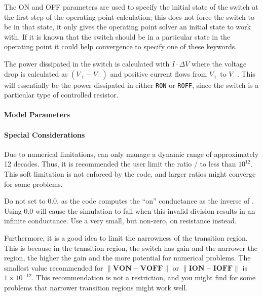 \begin{Device}
The ON and OFF parameters are used to specify the initial state of the
switch at the first step of the operating point calculation; this does
not force the switch to be in that state, it only gives the operating
point solver an initial state to work with.  If it is known that the
switch should be in a particular state in the operating point it could
help convergence to specify one of these keywords.

The power dissipated in the switch is calculated with $I \cdot \Delta V$ 
where the voltage drop is calculated as $(V_+ - V_-)$ and positive current 
flows from $V_+$ to $V_-$.  This will essentially be the power dissipated
in either \texttt{RON} or \texttt{ROFF}, since the switch is a particular 
type of controlled resistor.

\end{Device}

\pagebreak

\paragraph{Model Parameters}


\paragraph{Special Considerations}

\begin{XyceItemize}
\item Due to numerical limitations, \Xyce{} can only manage a dynamic range of
  approximately 12 decades.  Thus, it is recommended the user limit the ratio
  / to less than $10^{12}$.  This soft limitation is not enforced by the code, and larger ratios might converge for some problems.
\item Do not set  to 0.0, as the code computes the ``on'' conductance as the inverse of .  Using 0.0 will cause the simulation to fail when this invalid division results in an infinite conductance.  Use a very small, but non-zero, on resistance instead.
\item Furthermore, it is a good idea to limit the narrowness of the transition
  region. This is because in the transition region, the switch has gain and the
  narrower the region, the higher the gain and the more potential for numerical
  problems.  The smallest value recommended for $\|\mathbf{VON - VOFF}\|$ or
  $\|\mathbf{ION - IOFF}\|$ is $1\times10^{-12}$.  This recommendation is not a restriction, and you might find for some problems that narrower transition regions might work well.
\end{XyceItemize}


